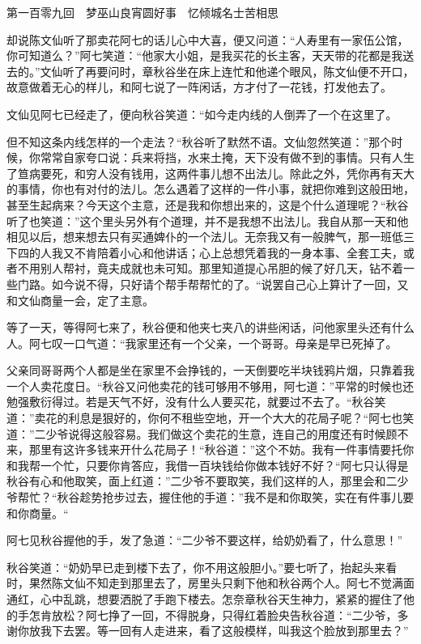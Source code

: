 \documentclass[12pt,UTF8]{ctexbook}
\begin{document}
{{{第一百零九回　梦巫山良宵圆好事　忆倾城名士苦相思





却说陈文仙听了那卖花阿七的话儿心中大喜，便又问道：“人寿里有一家伍公馆，你可知道么？”阿七笑道：“他家大小姐，是我买花的长主客，天天带的花都是我送去的。”文仙听了再要问时，章秋谷坐在床上连忙和他递个眼风，陈文仙便不开口，故意做着无心的样儿，和阿七说了一阵闲话，方才付了一花钱，打发他去了。

文仙见阿七已经走了，便向秋谷笑道：“如今走内线的人倒弄了一个在这里了。

但不知这条内线怎样的一个走法？“秋谷听了默然不语。文仙忽然笑道：”那个时候，你常常自家夸口说：兵来将挡，水来土掩，天下没有做不到的事情。只有人生了笪病要死，和穷人没有钱用，这两件事儿想不出法儿。除此之外，凭你再有天大的事情，你也有对付的法儿。怎么遇着了这样的一件小事，就把你难到这般田地，甚至生起病来？今天这个主意，还是我和你想出来的，这是个什么道理呢？“秋谷听了也笑道：”这个里头另外有个道理，并不是我想不出法儿。我自从那一天和他相见以后，想来想去只有买通婢仆的一个法儿。无奈我又有一般脾气，那一班低三下四的人我又不肯陪着小心和他讲话；心上总想凭着我的一身本事、全套工夫，或者不用别人帮衬，竟夫成就也未可知。那里知道提心吊胆的候了好几天，钻不着一些门路。如今说不得，只好请个帮手帮帮忙的了。“说罢自己心上算计了一回，又和文仙商量一会，定了主意。

等了一天，等得阿七来了，秋谷便和他夹七夹八的讲些闲话，问他家里头还有什么人。阿七叹一口气道：“我家里还有一个父亲，一个哥哥。母亲是早已死掉了。

父亲同哥哥两个人都是坐在家里不会挣钱的，一天倒要吃半块钱鸦片烟，只靠着我一个人卖花度日。“秋谷又问他卖花的钱可够用不够用，阿七道：”平常的时候也还勉强敷衍得过。若是天气不好，没有什么人要买花，就要过不去了。“秋谷笑道：”卖花的利息是狠好的，你何不租些空地，开一个大大的花局子呢？“阿七也笑道：”二少爷说得这般容易。我们做这个卖花的生意，连自己的用度还有时候顾不来，那里有这许多钱来开什么花局子！“秋谷道：”这个不妨。我有一件事情要托你和我帮一个忙，只要你肯答应，我借一百块钱给你做本钱好不好？“阿七只认得是秋谷有心和他取笑，面上红道：”二少爷不要取笑，我们这样的人，那里会和二少爷帮忙？“秋谷趁势抢步过去，握住他的手道：”我不是和你取笑，实在有件事儿要和你商量。“

阿七见秋谷握他的手，发了急道：“二少爷不要这样，给奶奶看了，什么意思！”

秋谷笑道：“奶奶早已走到楼下去了，你不用这般胆小。”要七听了，抬起头来看时，果然陈文仙不知走到那里去了，房里头只剩下他和秋谷两个人。阿七不觉满面通红，心中乱跳，想要洒脱了手跑下楼去。怎奈章秋谷天生神力，紧紧的握住了他的手怎肯放松？阿七挣了一回，不得脱身，只得红着脸央告秋谷道：“二少爷，多谢你放我下去罢。等一回有人走进来，看了这般模样，叫我这个脸放到那里去？”

}}}
\end{document}
